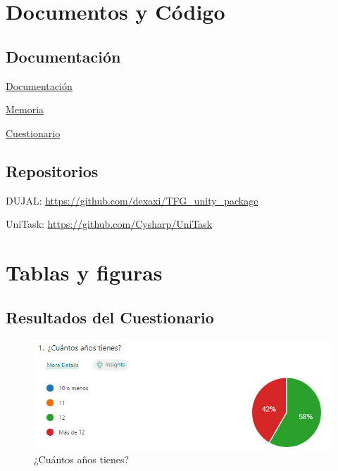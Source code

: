 \section{Documentos y Código}
\subsection{Documentación}
\begin{compactitem}
  \item \href{https://github.com/dexaxi/TFG_Unity_Package/blob/main/Assets/DUJAL/Documentation/DUJAL%20Documentation.pdf}{Documentación}
  \item \href{https://github.com/dexaxi/TFG_Unity_Package/blob/main/Assets/DUJAL/Documentation/Memoria%20TFG%20%C3%81ngel%20Baeza%20S%C3%A1nchez.pdf}{Memoria}
  \item \href{https://docs.google.com/forms/d/e/1FAIpQLSd1cEq_ghDKNGu-EFjOm2AS5huoM882GzUzjwZkY_DLQak9Fw/viewform?usp=sharing&ouid=100594158238727737282}{Cuestionario}
\end{compactitem}

\subsection{Repositorios}
\begin{compactitem}
  \item DUJAL: \url{https://github.com/dexaxi/TFG_unity_package}
  \item UniTask: \url{https://github.com/Cysharp/UniTask}
\end{compactitem}


\section{Tablas y figuras}
\subsection{Resultados del Cuestionario}
\begin{figure}[H]
  \centering
  \includegraphics[width=450px,clip=true]{questionario_1.png}
  \caption{¿Cuántos años tienes?}
  \label{fig:questionario_1}
\end{figure}
\raggedbottom


